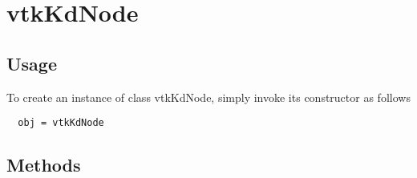 \section{vtkKdNode}

\subsection{Usage}

     

To create an instance of class vtkKdNode, simply
invoke its constructor as follows
\begin{verbatim}
  obj = vtkKdNode
\end{verbatim}
\subsection{Methods}

